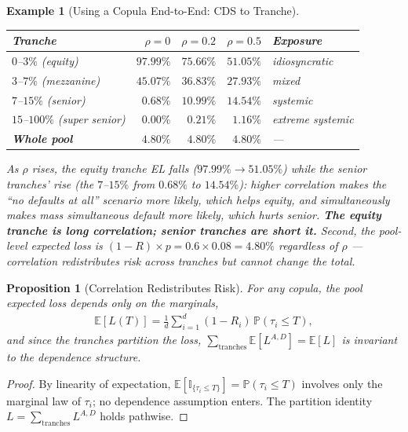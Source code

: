 \documentclass{report}
\theoremstyle{spacedplain}
\newtheorem{proposition}[theorem]{Proposition}
\theoremstyle{spaceddefinition}
\newtheorem{example}[theorem]{Example}
\theoremstyle{spacedremark}
\begin{document}
\begin{example}[Using a Copula End-to-End: CDS to Tranche]
\begin{center}
\renewcommand{\arraystretch}{1.15}
\begin{tabular}{@{}lrrrl@{}}
\toprule
\textbf{Tranche} & $\rho = 0$ & $\rho = 0.2$ & $\rho = 0.5$ & \textbf{Exposure} \\
\midrule
$0$--$3\%$ (equity)          & $97.99\%$ & $75.66\%$ & $51.05\%$ & idiosyncratic \\
$3$--$7\%$ (mezzanine)       & $45.07\%$ & $36.83\%$ & $27.93\%$ & mixed \\
$7$--$15\%$ (senior)         & $0.68\%$  & $10.99\%$ & $14.54\%$ & systemic \\
$15$--$100\%$ (super senior) & $0.00\%$  & $0.21\%$  & $1.16\%$  & extreme systemic \\
\midrule
\textbf{Whole pool} & $\mathbf{4.80\%}$ & $\mathbf{4.80\%}$ & $\mathbf{4.80\%}$ & --- \\
\bottomrule
\end{tabular}
\end{center}

As $\rho$ rises, the equity tranche EL \emph{falls} ($97.99\% \to 51.05\%$) while the senior tranches' \emph{rise} (the $7$--$15\%$ from $0.68\%$ to $14.54\%$): higher correlation makes the ``no defaults at all'' scenario more likely, which helps equity, and simultaneously makes mass simultaneous default more likely, which hurts senior. \textbf{The equity tranche is long correlation; senior tranches are short it.} Second, the pool-level expected loss is $(1-R)\times p = 0.6 \times 0.08 = 4.80\%$ \emph{regardless of $\rho$} --- correlation redistributes risk across tranches but cannot change the total.
\end{example}

\begin{proposition}[Correlation Redistributes Risk]
For \emph{any} copula, the pool expected loss depends only on the marginals,
\begin{align}
    \mathbb{E}[L(T)] = \frac{1}{d}\sum_{i=1}^d (1-R_i)\,\mathbb{P}(\tau_i \leq T),
\end{align}
and since the tranches partition the loss, $\sum_{\text{tranches}} \mathbb{E}[L^{A,D}] = \mathbb{E}[L]$ is invariant to the dependence structure.
\end{proposition}
\begin{proof}
By linearity of expectation, $\mathbb{E}[\mathbb{I}_{\{\tau_i \leq T\}}] = \mathbb{P}(\tau_i \leq T)$ involves only the marginal law of $\tau_i$; no dependence assumption enters. The partition identity $L = \sum_{\text{tranches}} L^{A,D}$ holds pathwise.
\end{proof}
\end{document}
